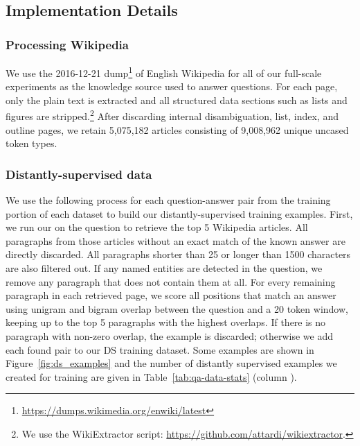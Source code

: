 \subsection{Implementation Details}

\subsubsection{Processing Wikipedia}
We use the 2016-12-21 dump\footnote{\url{https://dumps.wikimedia.org/enwiki/latest}} of English Wikipedia for all of our full-scale experiments as the knowledge source used to answer questions. For each page, only the plain text is extracted and all structured data sections such as lists and figures are stripped.\footnote{We use the WikiExtractor script: \url{https://github.com/attardi/wikiextractor}.} After discarding internal disambiguation, list, index, and outline pages, we retain 5,075,182 articles consisting of 9,008,962 unique uncased token types.


\subsubsection{Distantly-supervised data}
We use the following process for each question-answer pair from the training portion of each dataset to build our distantly-supervised training examples. First, we run our  on the question to retrieve the top 5 Wikipedia articles. All paragraphs from those articles without an exact match of the known answer are directly discarded. All paragraphs  shorter than 25 or longer than 1500  characters are also filtered out. If any named entities are detected in the question, we remove any paragraph that does not contain them at all. For every remaining paragraph in each retrieved page, we score all positions that match an answer using unigram and bigram overlap between the question and a 20 token window, keeping up to the top 5 paragraphs with the highest overlaps. If there is no paragraph with non-zero overlap, the example is discarded; otherwise we add each found pair to our DS training dataset. Some examples are shown in Figure~\ref{fig:ds_examples} and the number of distantly supervised examples we created for training are given in Table~\ref{tab:qa-data-stats} (column ).


